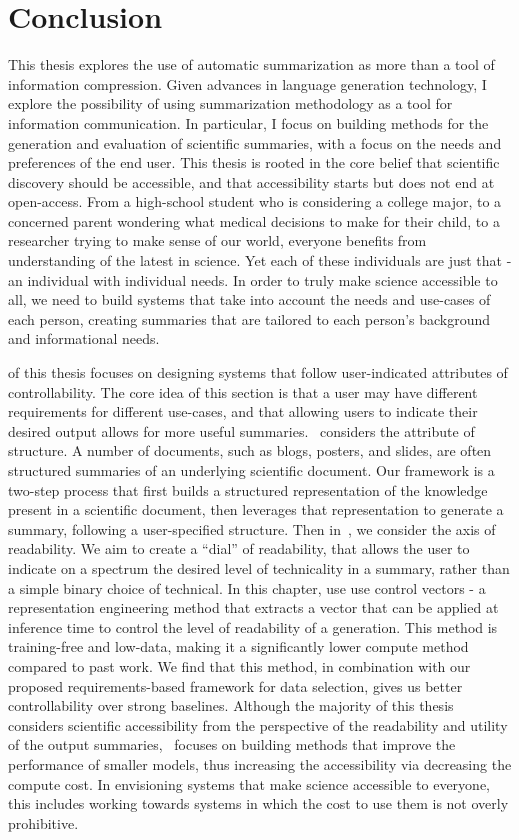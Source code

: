\chapter{Conclusion} \label{chap:conlcusion}

This thesis explores the use of automatic summarization as more than a tool of information compression. Given advances in language generation technology, I explore the possibility of using summarization methodology as a tool for information communication. In particular, I focus on building methods for the generation and evaluation of scientific summaries, with a focus on the needs and preferences of the end user. This thesis is rooted in the core belief that scientific discovery should be accessible, and that accessibility starts but does not end at open-access. From a high-school student who is considering a college major, to a concerned parent wondering what medical decisions to make for their child, to a researcher trying to make sense of our world, everyone benefits from understanding of the latest in science. Yet each of these individuals are just that - an individual with individual needs. In order to truly make science accessible to all, we need to build systems that take into account the needs and use-cases of each person, creating summaries that are tailored to each person's background and informational needs.

 of this thesis focuses on designing systems that follow user-indicated attributes of controllability. The core idea of this section is that a user may have different requirements for different use-cases, and that allowing users to indicate their desired output allows for more useful summaries.~ considers the attribute of structure. A number of documents, such as blogs, posters, and slides, are often structured summaries of an underlying scientific document. Our framework is a two-step process that first builds a structured representation of the knowledge present in a scientific document, then leverages that representation to generate a summary, following a user-specified structure. Then in~, we consider the axis of readability. We aim to create a ``dial'' of readability, that allows the user to indicate on a spectrum the desired level of technicality in a summary, rather than a simple binary choice of technical. In this chapter, use use control vectors - a representation engineering method that extracts a vector that can be applied at inference time to control the level of readability of a generation. This method is training-free and low-data, making it a significantly lower compute method compared to past work. We find that this method, in combination with our proposed requirements-based framework for data selection, gives us better controllability over strong baselines. Although the majority of this thesis considers scientific accessibility from the perspective of the readability and utility of the output summaries,~ focuses on building methods that improve the performance of smaller models, thus increasing the accessibility via decreasing the compute cost. In envisioning systems that make science accessible to everyone, this includes working towards systems in which the cost to use them is not overly prohibitive. 

